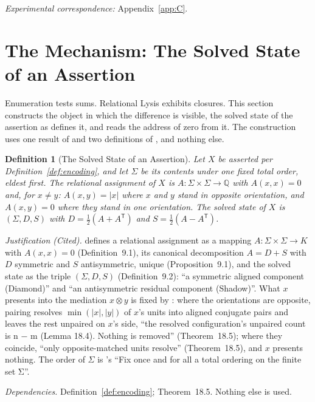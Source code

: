 \documentclass[pdflatex,sn-mathphys-num]{sn-jnl}
\theoremstyle{thmstyleone}%
\theoremstyle{thmstyletwo}%
\theoremstyle{thmstylethree}%
\newtheorem{definition}{Definition}[section]
\newtheorem{definition}{Definition}[section]
\newcommand{\PA}{\cite{Swanagon2026PA}}
\newcommand{\q}[1]{``#1''}        %
\newcommand{\qq}[1]{``#1''}       %
\newcommand{\YM}{\cite{Swanagon2026YangMills}}
\newcommand{\deps}[1]{\par\begin{sloppypar}\noindent\emph{Dependencies.} #1 Nothing else is used.\end{sloppypar}}
\begin{document}
\noindent\emph{Experimental correspondence:} Appendix~\ref{app:C}.


\section{The Mechanism: The Solved State of an Assertion}\label{sec:solved}
Enumeration tests sums. Relational Lysis exhibits closures. This section constructs the object in which the difference is visible, the solved state of the assertion as \YM{} defines it, and reads the address of zero from it. The construction uses one result of \PA{} and two definitions of \YM{}, and nothing else.

\begin{definition}[The Solved State of an Assertion]\label{def:solved}
Let $X$ be asserted per Definition~\ref{def:encoding}, and let $\Sigma$ be its contents under one fixed total order, eldest first. The \emph{relational assignment} of $X$ is $A:\Sigma\times\Sigma\to\mathbb{Q}$ with $A(x,x)=0$ and, for $x\ne y$: $A(x,y)=|x|$ where $x$ and $y$ stand in opposite orientation, and $A(x,y)=0$ where they stand in one orientation. The \emph{solved state} of $X$ is $(\Sigma,D,S)$ with $D=\tfrac12(A+A^{\mathsf T})$ and $S=\tfrac12(A-A^{\mathsf T})$.
\end{definition}
\noindent\emph{Justification (Cited).} \YM{} defines a relational assignment as a mapping $A:\Sigma\times\Sigma\to K$ with $A(x,x)=0$ (Definition~9.1), its canonical decomposition $A=D+S$ with $D$ symmetric and $S$ antisymmetric, unique (Proposition~9.1), and the solved state as the triple $(\Sigma,D,S)$ (Definition~9.2): \qq{a symmetric aligned component (Diamond)} and \qq{an antisymmetric residual component (Shadow)}. What $x$ presents into the mediation $x\otimes y$ is fixed by \PA{}: where the orientations are opposite, pairing resolves $\min(|x|,|y|)$ of $x$'s units into aligned conjugate pairs and leaves the rest unpaired on $x$'s side, \q{the resolved configuration's unpaired count is n − m (Lemma 18.4). Nothing is removed} (Theorem~18.5); where they coincide, \q{only opposite-matched units resolve} (Theorem~18.5), and $x$ presents nothing. The order of $\Sigma$ is \YM's \qq{Fix once and for all a total ordering on the finite set Σ}.
\deps{Definition~\ref{def:encoding}; Theorem~18.5.}
\end{document}
